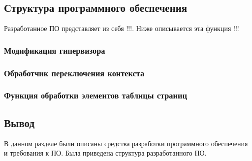 \subsection{Структура программного обеспечения}

Разработанное ПО представляет из себя !!!. Ниже описывается эта функция  !!!

\subsubsection{Модификация гипервизора}

\subsubsection{Обработчик переключения контекста}

\subsubsection{Функция обработки элементов таблицы страниц}

\subsection*{Вывод}

В данном разделе были описаны средства разработки программного обеспечения и требования к ПО. Была приведена структура разработанного ПО.

\pagebreak
